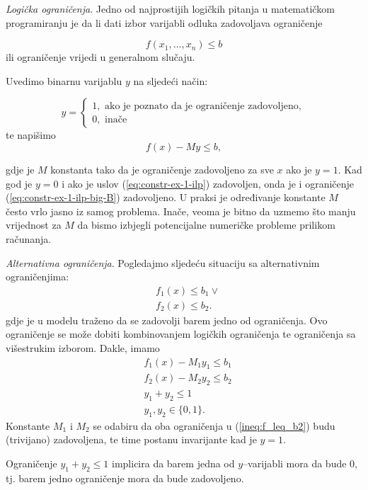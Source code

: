 \documentclass[a4paper, utf8, 11pt, colorlinks]{article}
\begin{document}
\emph{Logička ograničenja}. Jedno od najprostijih logičkih pitanja u matematičkom programiranju je da li dati izbor varijabli odluka zadovoljava ograničenje

\begin{equation}\label{eq:constr-ex-1-ilp}
   f(x_1,\ldots, x_n )\leq b
\end{equation}
 ili   ograničenje vrijedi u generalnom slučaju.
 
 Uvedimo binarnu varijablu $y$ na sljedeći način:
 
$$y =\begin{cases}
1, \mbox{ ako je poznato da je ograničenje zadovoljeno}, \\
0, \mbox{ inače}
\end{cases}$$
te napišimo 
\begin{equation}\label{eq:constr-ex-1-ilp-big-B}
   f(x) - M y \leq b,
\end{equation}

gdje je $M$ konstanta tako da je 
ograničenje zadovoljeno za sve $x$ ako je $y =1$. Kad god je $y=0$ i ako je uslov (\ref{eq:constr-ex-1-ilp}) zadovoljen, onda je i ograničenje (\ref{eq:constr-ex-1-ilp-big-B}) zadovoljeno. U praksi je određivanje konstante $M$ često vrlo jasno iz samog problema. Inače, veoma je bitno da uzmemo što manju vrijednost za $M$ da bismo izbjegli potencijalne numeričke probleme prilikom računanja. 

\emph{Alternativna ograničenja}. Pogledajmo sljedeću situaciju sa alternativnim ograničenjima:
\begin{align}
     &f_1(x) \leq b_1 \vee \nonumber\\
     &f_2(x) \leq b_2.\label{ineq:f_leq_b2}
\end{align}
gdje je u modelu traženo da se zadovolji barem jedno od ograničenja. 
Ovo ograničenje se može dobiti kombinovanjem logičkih ograničenja te ograničenja sa višestrukim izborom. Dakle, imamo 
\begin{align*}
      &f_1(x) - M_1 y_1  \leq b_1 \\
      &f_2(x) - M_2 y_2  \leq b_2 \\
      & y_1 + y_2 \leq 1 \\
      & y_1, y_2 \in \{0, 1\}.
\end{align*}
Konstante $M_1$ i $M_2$ se odabiru da oba ograničenja u (\ref{ineq:f_leq_b2})  budu (trivijano) zadovoljena, te time postanu invarijante kad je $y=1$.

Ograničenje $y_1 + y_2 \leq 1$ implicira da barem jedna od $y$--varijabli mora da bude 0, tj. barem jedno ograničenje mora da bude zadovoljeno. 
\end{document}
